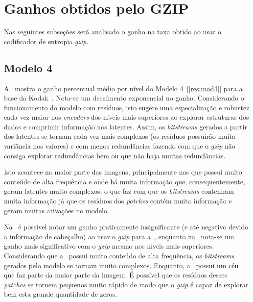 
\section{Ganhos obtidos pelo GZIP}
\label{res:gzip}
Nas seguintes subseções será analisado o ganho na taxa obtido ao usar o codificador de entropia \textit{gzip}.
\subsection{Modelo 4}
A~ mostra o ganho percentual médio por nível do Modelo 4~[\ref{res:mod4}] para a base da Kodak~\cite{kodak}. Nota-se um decaímento exponencial no ganho. Considerando o funcionamento do modelo com resíduos, isto sugere uma especialização e robustez cada vez maior nos \textit{encoders} dos níveis mais superiores ao explorar estruturas dos dados e comprimir informação nos latentes. Assim, os \textit{bitstreams} gerados a partir dos latentes se tornam cada vez mais complexos (os resíduos possuirão muita variância nos valores) e com menos redundâncias fazendo com que o \textit{gzip} não consiga explorar redundâncias bem ou que não haja muitas redundâncias. 

Isto acontece na maior parte das imagens, principalmente nas que possui muito conteúdo de alta frequência e onde há muita informação que, consequentemente, geram latentes muito complexos, o que faz com que os \textit{bitstreams} contenham muita informação já que os resíduos dos \textit{patches} contém muita informação e geram muitas ativações no modelo.


Na~ é possível notar um ganho praticamente insignificante (e até negativo devido a informação de cabeçalho) ao usar o \textit{gzip} para a~, enquanto na~ nota-se um ganho mais significativo com o \textit{gzip} mesmo nos níveis mais superiores. Considerando que a~ possui muito conteúdo de alta frequência, os \textit{bitstreams} gerados pelo modelo se tornam muito complexos. Enquanto, a~ possui um céu que faz parte da maior parte da imagem. É possível que os resíduos desses \textit{patches} se tornem pequenos muito rápido de modo que o \textit{gzip} é capaz de explorar bem esta grande quantidade de zeros.

